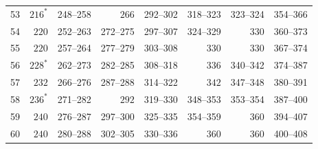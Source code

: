 \begin{longtable}{@{}r*{7}{r}@{}}
53&\(216^{*}\)&248--258&\(266\)&292--302&318--323&323--324&354--366\\
54&\(220\)&252--263&272--275&297--307&324--329&\(330\)&360--373\\
55&\(220\)&257--264&277--279&303--308&\(330\)&\(330\)&367--374\\
56&\(228^{*}\)&262--273&282--285&308--318&\(336\)&340--342&374--387\\
57&\(232\)&266--276&287--288&314--322&\(342\)&347--348&380--391\\
58&\(236^{*}\)&271--282&\(292\)&319--330&348--353&353--354&387--400\\
59&\(240\)&276--287&297--300&325--335&354--359&\(360\)&394--407\\
60&\(240\)&280--288&302--305&330--336&\(360\)&\(360\)&400--408\\
\end{longtable}

